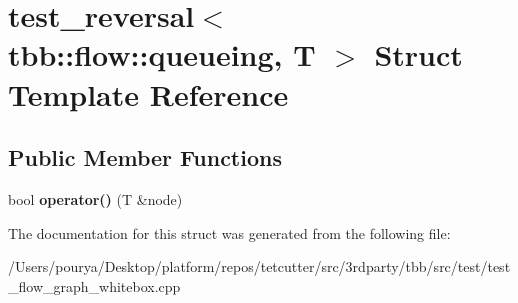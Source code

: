 \hypertarget{structtest__reversal_3_01tbb_1_1flow_1_1queueing_00_01T_01_4}{}\section{test\+\_\+reversal$<$ tbb\+:\+:flow\+:\+:queueing, T $>$ Struct Template Reference}
\label{structtest__reversal_3_01tbb_1_1flow_1_1queueing_00_01T_01_4}
\subsection*{Public Member Functions}
\begin{DoxyCompactItemize}
\item 
\hypertarget{structtest__reversal_3_01tbb_1_1flow_1_1queueing_00_01T_01_4_ac3ef57707953683b2cc24cee624cad89}{}bool {\bfseries operator()} (T \&node)\label{structtest__reversal_3_01tbb_1_1flow_1_1queueing_00_01T_01_4_ac3ef57707953683b2cc24cee624cad89}

\end{DoxyCompactItemize}


The documentation for this struct was generated from the following file\+:\begin{DoxyCompactItemize}
\item 
/\+Users/pourya/\+Desktop/platform/repos/tetcutter/src/3rdparty/tbb/src/test/test\+\_\+flow\+\_\+graph\+\_\+whitebox.\+cpp\end{DoxyCompactItemize}
